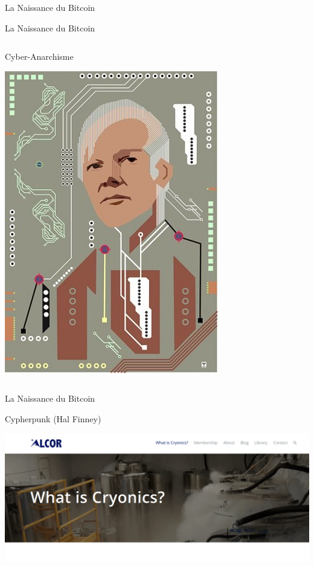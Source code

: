\documentclass[presentation]{beamer}
\begin{document}
\begin{frame}[label={sec:org3b084ec}]{La Naissance du Bitcoin}
\begin{block}{La Naissance du Bitcoin}
\begin{columns}
\begin{column}{0.30\columnwidth}
\begin{block}{Cyber-Anarchisme}
\begin{center}
\includegraphics[width=.7\linewidth]{Pictures/assange.jpg}
\end{center}
\end{block}
\end{column}
\end{columns}
\end{block}

\begin{block}{La Naissance du Bitcoin}
\begin{block}{Cypherpunk (Hal Finney)}
\begin{center}
\includegraphics[width=\linewidth]{Pictures/cryonics_hal_finney.png}
\end{center}
\end{block}
\end{block}
\end{frame}
\end{document}
